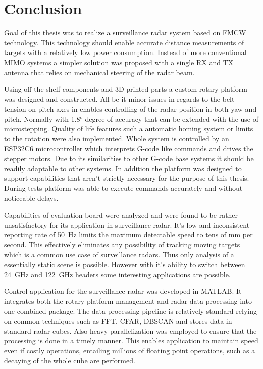 \chapter*{Conclusion}

Goal of this thesis was to realize a surveillance radar system based on FMCW technology.
This technology should enable accurate distance measurements of targets with a relatively low power consumption.
Instead of more conventional MIMO systems a simpler solution was proposed with a single RX and TX antenna that relies on mechanical steering of the radar beam.

Using off-the-shelf components and 3D printed parts a custom rotary platform was designed and constructed.
All be it minor issues in regards to the belt tension on pitch axes in enables controlling of the radar position in both yaw and pitch.
Normally with 1.8° degree of accuracy that can be extended with the use of microstepping.
Quality of life features such a automatic homing system or limits to the rotation were also implemented.
Whole system is controlled by an ESP32C6 microcontroller which interprets G-code like commands and drives the stepper motors.
Due to its similarities to other G-code base systems it should be readily adaptable to other systems.
In addition the platform was designed to support capabilities that aren't strictly necessary for the purpose of this thesis.
During tests platform was able to execute commands accurately and without noticeable delays.

Capabilities of \sidar evaluation board were analyzed and were found to be rather unsatisfactory for its application in surveillance radar.
It's low and inconsistent reporting rate of 50~Hz limits the maximum detectable speed to tens of mm per second.
This effectively eliminates any possibility of tracking moving targets which is a common use case of surveillance radars.
Thus only analysis of a essentially static scene is possible.
However with it's ability to switch between 24~GHz and 122~GHz headers some interesting applications are possible.

Control application for the surveillance radar was developed in MATLAB.
It integrates both the rotary platform management and radar data processing into one combined package.
The data processing pipeline is relatively standard relying on common techniques such as FFT, CFAR, DBSCAN and stores data in standard radar cubes.
Also heavy parallelization was employed to ensure that the processing is done in a timely manner.
This enables application to maintain speed even if costly operations, entailing millions of floating point operations, such as a decaying of the whole cube are performed.

